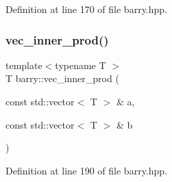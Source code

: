 Definition at line 170 of file barry.\+hpp.

\mbox{\label{namespacebarry_a0343fb4152724d5fa1ffa00d4b6182d9}} 
\subsubsection{\texorpdfstring{vec\+\_\+inner\+\_\+prod()}{vec\_inner\_prod()}}
{\footnotesize\ttfamily template$<$typename T $>$ \\
T barry\+::vec\+\_\+inner\+\_\+prod (\begin{DoxyParamCaption}\item[{const std\+::vector$<$ T $>$ \&}]{a,  }\item[{const std\+::vector$<$ T $>$ \&}]{b }\end{DoxyParamCaption})\hspace{0.3cm}{\ttfamily [inline]}}



Definition at line 190 of file barry.\+hpp.

